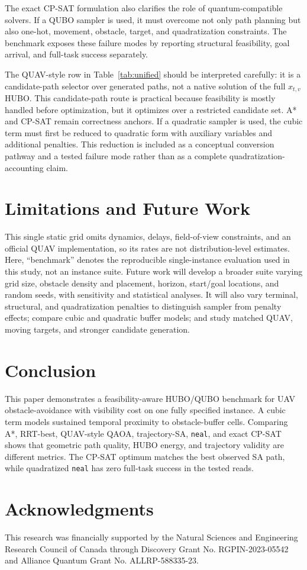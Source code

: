 \documentclass[letterpaper]{article} %
\begin{document}
The exact CP-SAT formulation also clarifies the role of quantum-compatible solvers. If a QUBO sampler is used, it must overcome not only path planning but also one-hot, movement, obstacle, target, and quadratization constraints. The benchmark exposes these failure modes by reporting structural feasibility, goal arrival, and full-task success separately.

The QUAV-style row in Table~\ref{tab:unified} should be interpreted carefully: it is a candidate-path selector over generated paths, not a native solution of the full $x_{t,v}$ HUBO. This candidate-path route is practical because feasibility is mostly handled before optimization, but it optimizes over a restricted candidate set. A* and CP-SAT remain correctness anchors. If a quadratic sampler is used, the cubic term must first be reduced to quadratic form with auxiliary variables and additional penalties. This reduction is included as a conceptual conversion pathway and a tested failure mode rather than as a complete quadratization-accounting claim.

\section{Limitations and Future Work}
This single static grid omits dynamics, delays, field-of-view constraints, and an official QUAV implementation, so its rates are not distribution-level estimates. Here, ``benchmark'' denotes the reproducible single-instance evaluation used in this study, not an instance suite. Future work will develop a broader suite varying grid size, obstacle density and placement, horizon, start/goal locations, and random seeds, with sensitivity and statistical analyses. It will also vary terminal, structural, and quadratization penalties to distinguish sampler from penalty effects; compare cubic and quadratic buffer models; and study matched QUAV, moving targets, and stronger candidate generation.

\section{Conclusion}
This paper demonstrates a feasibility-aware HUBO/QUBO benchmark for UAV obstacle-avoidance with visibility cost on one fully specified instance. A cubic term models sustained temporal proximity to obstacle-buffer cells. Comparing A*, RRT-best, QUAV-style QAOA, trajectory-SA, \texttt{neal}, and exact CP-SAT shows that geometric path quality, HUBO energy, and trajectory validity are different metrics. The CP-SAT optimum matches the best observed SA path, while quadratized \texttt{neal} has zero full-task success in the tested reads.

\section*{Acknowledgments}
This research was financially supported by the Natural Sciences and Engineering Research Council of Canada through Discovery Grant No. RGPIN-2023-05542 and Alliance Quantum Grant No. ALLRP-588335-23.


{\small

}
\end{document}

